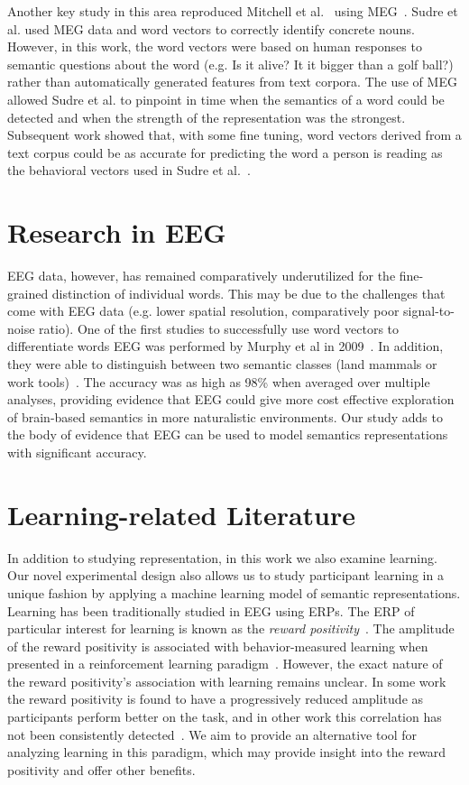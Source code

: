 Another key study in this area reproduced Mitchell et al.~\cite{Mitchell2008} 
using MEG~\cite{Sudre2012}.  Sudre et al. used MEG data and word vectors to 
correctly identify concrete nouns.  However, in this work, the  word vectors 
were based on human responses to semantic questions about the word (e.g. Is it 
alive?  It it bigger than a golf ball?) rather than automatically generated 
features from text corpora. The use of MEG allowed Sudre et al. to pinpoint in 
time when the semantics of a word could be detected and when the strength of 
the representation was the strongest.  Subsequent work showed that, with some 
fine tuning, word vectors derived from a text corpus could be as accurate for 
predicting the word a person is reading as the behavioral vectors used in Sudre 
et al.~\cite{Murphy2012}.

\section{Research in EEG}

EEG data, however, has remained comparatively underutilized for the 
fine-grained distinction of individual words. This may be due to the challenges 
that come with EEG data (e.g. lower spatial resolution, comparatively poor 
signal-to-noise ratio).  One of the first studies to successfully use word 
vectors to differentiate words EEG was performed by Murphy et al in 
2009~\cite{Murphy2009}.  In addition, they were able to distinguish between two 
semantic classes (land mammals or work tools)~\cite{Murphy2009,Murphy2011}. The 
accuracy was as high as 98\% when averaged over multiple analyses, providing 
evidence that EEG could give more cost effective exploration of brain-based 
semantics in more naturalistic environments.  Our study adds to the body of 
evidence that EEG can be used to model semantics representations with 
significant accuracy.

\section{Learning-related Literature}

In addition to studying representation, in this work we also examine learning. 
Our novel experimental design also allows us to study participant learning in a 
unique fashion by applying a machine learning model of semantic 
representations. Learning has been traditionally studied in EEG using ERPs. The 
ERP of particular interest for learning is known as the \emph{reward 
positivity}~\cite{proudfit2015reward}. The amplitude of the reward positivity 
is associated with behavior-measured learning when presented in a reinforcement 
learning paradigm~\cite{holroyd2002neural, sutton1998reinforcement, 
williams2017application}. However, the exact nature of the reward positivity's 
association with learning remains unclear. In some work the reward positivity 
is found to have a progressively reduced amplitude as participants perform 
better on the task, and in other work this correlation has not been 
consistently detected~\cite{walsh2012learning}. We aim to provide an 
alternative tool for analyzing learning in this paradigm, which may provide 
insight into the reward positivity and offer other benefits.

